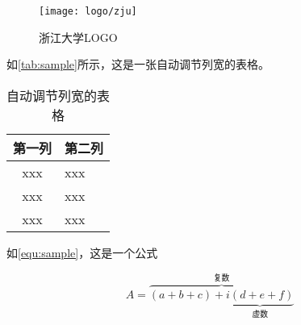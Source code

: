 \begin{figure}[ht]
    \centering
    \texttt{[image: logo/zju]}
    \caption{\label{fig:zju-logo}浙江大学LOGO}
\end{figure}

\par 如\autoref{tab:sample}所示，这是一张自动调节列宽的表格。

\begin{table}[ht]
    \caption{\label{tab:sample}自动调节列宽的表格}
    \begin{tabularx}{\linewidth}{c|X<{\centering}}
        \hline
        第一列 & 第二列 \\ \hline
        xxx & xxx \\ \hline
        xxx & xxx \\ \hline
        xxx & xxx \\ \hline
    \end{tabularx}
\end{table}

\par 如\autoref{equ:sample}，这是一个公式

\begin{equation}
    \label{equ:sample}
    A=\overbrace{(a+b+c)+\underbrace{i(d+e+f)}_{\text{虚数}}}^{\text{复数}}
\end{equation}
